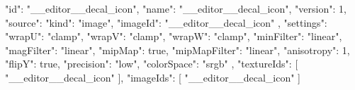 {
  "id": "__editor__decal_icon",
  "name": "__editor__decal_icon",
  "version": 1,
  "source": {
    "kind": "image",
    "imageId": "__editor__decal_icon"
  },
  "settings": {
    "wrapU": "clamp",
    "wrapV": "clamp",
    "wrapW": "clamp",
    "minFilter": "linear",
    "magFilter": "linear",
    "mipMap": true,
    "mipMapFilter": "linear",
    "anisotropy": 1,
    "flipY": true,
    "precision": "low",
    "colorSpace": "srgb"
  },
  "textureIds": [
    "__editor__decal_icon"
  ],
  "imageIds": [
    "__editor__decal_icon"
  ]
}
